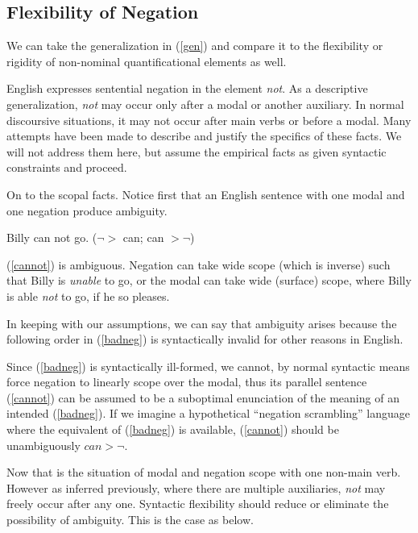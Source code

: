 \documentclass{article}
\begin{document}
\subsection{Flexibility of Negation}

We can take the generalization in (\ref{gen}) and compare it to the flexibility or rigidity of non-nominal quantificational elements as well.

English expresses sentential negation in the element \emph{not}. As a descriptive generalization, \emph{not} may occur only after a modal or another auxiliary. In normal discoursive situations, it may not occur after main verbs or before a modal. Many attempts have been made to describe and justify the specifics of these facts. We will not address them here, but assume the empirical facts as given syntactic constraints and proceed.

On to the scopal facts. Notice first that an English sentence with one modal and one negation produce ambiguity.

\begin{exe}
\ex Billy can not go. \label{cannot}\hfill ($\neg >$ can; can $> \neg$) 
\end{exe}

(\ref{cannot}) is ambiguous. Negation can take wide scope (which is inverse) such that Billy is \emph{unable} to go, or the modal can take wide (surface) scope, where Billy is able \emph{not} to go, if he so pleases.

In keeping with our assumptions, we can say that ambiguity arises because the following order in (\ref{badneg}) is syntactically invalid for other reasons in English.

\begin{exe}
\end{exe}

Since (\ref{badneg}) is syntactically ill-formed, we cannot, by normal syntactic means force negation to linearly scope over the modal, thus its parallel sentence (\ref{cannot}) can be assumed to be a suboptimal enunciation of the meaning of an intended (\ref{badneg}). If we imagine a hypothetical ``negation scrambling'' language where the equivalent of (\ref{badneg}) is available, (\ref{cannot}) should be unambiguously $can > \neg$.

Now that is the situation of modal and negation scope with one non-main verb. However as inferred previously, where there are multiple auxiliaries, \emph{not} may freely occur after any one. Syntactic flexibility should reduce or eliminate the possibility of ambiguity. This is the case as below.
\end{document}
